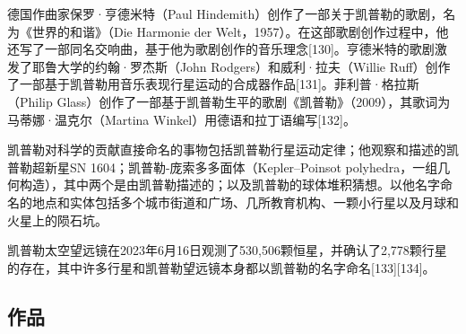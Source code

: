 德国作曲家保罗·亨德米特（Paul Hindemith）创作了一部关于凯普勒的歌剧，名为《世界的和谐》（Die Harmonie der Welt，1957）。在这部歌剧创作过程中，他还写了一部同名交响曲，基于他为歌剧创作的音乐理念[130]。亨德米特的歌剧激发了耶鲁大学的约翰·罗杰斯（John Rodgers）和威利·拉夫（Willie Ruff）创作了一部基于凯普勒用音乐表现行星运动的合成器作品[131]。菲利普·格拉斯（Philip Glass）创作了一部基于凯普勒生平的歌剧《凯普勒》（2009），其歌词为马蒂娜·温克尔（Martina Winkel）用德语和拉丁语编写[132]。

凯普勒对科学的贡献直接命名的事物包括凯普勒行星运动定律；他观察和描述的凯普勒超新星SN 1604；凯普勒-庞索多多面体（Kepler–Poinsot polyhedra，一组几何构造），其中两个是由凯普勒描述的；以及凯普勒的球体堆积猜想。以他名字命名的地点和实体包括多个城市街道和广场、几所教育机构、一颗小行星以及月球和火星上的陨石坑。

凯普勒太空望远镜在2023年6月16日观测了530,506颗恒星，并确认了2,778颗行星的存在，其中许多行星和凯普勒望远镜本身都以凯普勒的名字命名[133][134]。
\subsection{作品}

